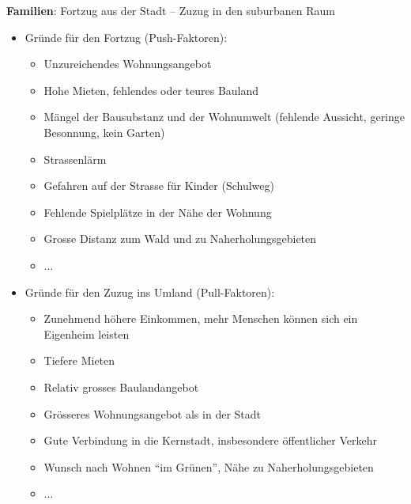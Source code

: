 \begin{myexercise}
\begin{myanswer}
\textbf{Familien}: Fortzug aus der Stadt -- Zuzug in den suburbanen Raum
\begin{itemize}
    \item Gründe für den Fortzug (Push-Faktoren):
    \begin{itemize}
        \item Unzureichendes Wohnungsangebot
        \item Hohe Mieten, fehlendes oder teures Bauland
        \item Mängel der Bausubstanz und der Wohnumwelt (fehlende Aussicht, geringe Besonnung, kein Garten)
        \item Strassenlärm
        \item Gefahren auf der Strasse für Kinder (Schulweg)
        \item Fehlende Spielplätze in der Nähe der Wohnung
        \item Grosse Distanz zum Wald und zu Naherholungsgebieten
        \item ...
    \end{itemize}
    \item Gründe für den Zuzug ins Umland (Pull-Faktoren):
    \begin{itemize}
        \item Zunehmend höhere Einkommen, mehr Menschen können sich ein Eigenheim leisten
        \item Tiefere Mieten
        \item Relativ grosses Baulandangebot
        \item Grösseres Wohnungsangebot als in der Stadt
        \item Gute Verbindung in die Kernstadt, insbesondere öffentlicher Verkehr
        \item Wunsch nach Wohnen \enquote{im Grünen}, Nähe zu Naherholungsgebieten
        \item ...
    \end{itemize}
\end{itemize}


\end{myanswer}
\end{myexercise}
